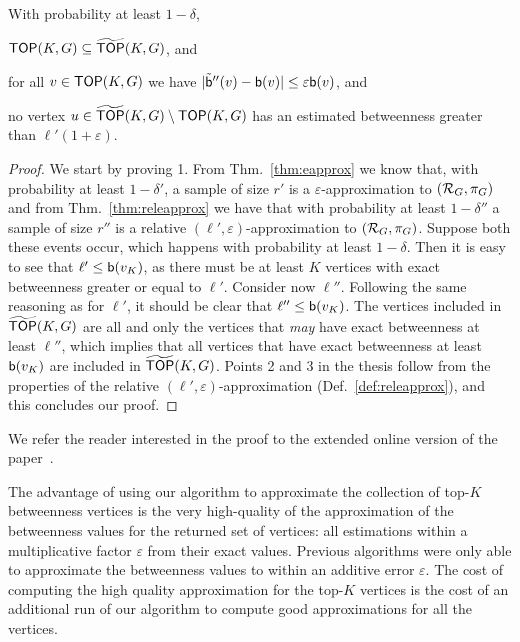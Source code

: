 \begin{lemma}\label{lem:topk}
  With probability at least $1-\delta$, 
  \begin{enumerate*}
    \item $\mathsf{TOP}(K,G)\subseteq \widetilde{\mathsf{TOP}}(K,G)$, and
    \item for all $v\in\mathsf{TOP}(K,G)$ we have
      $|\tilde{\mathsf{b}}''(v)-\mathsf{b}(v)|\le\varepsilon\mathsf{b}(v)$, and
    \item no vertex $u\in\widetilde{\mathsf{TOP}}(K,G)\setminus\mathsf{TOP}(K,G)$ has an estimated
      betweenness greater than $\ell'(1+\varepsilon)$.
  \end{enumerate*}
\end{lemma}
\ifproof
\begin{proof}
  We start by proving 1. From Thm.~\ref{thm:eapprox} we know that, with probability at least
  $1-\delta'$, a sample of size $r'$ is a $\varepsilon$-approximation to
  $(\mathcal{R}_G,\pi_G)$ and from Thm.~\ref{thm:releapprox} we have that with
  probability at least $1-\delta''$ a sample of size $r''$ is a relative
  $(\ell',\varepsilon)$-approximation to $(\mathcal{R}_G,\pi_G)$. Suppose both these
  events occur, which happens with probability at least $1-\delta$. Then it is
  easy to see that $\ell'\le\mathsf{b}(v_K)$, as there must be at least $K$ vertices
  with exact betweenness greater or equal to $\ell'$.  Consider now $\ell''$.
  Following the same reasoning as for $\ell'$, it should be clear that
  $\ell''\le\mathsf{b}(v_K)$. The vertices included in $\widetilde{\mathsf{TOP}}(K,G)$ are all and
  only the vertices that \emph{may} have exact betweenness at least $\ell''$,
  which implies that all vertices that have exact betweenness at least
  $\mathsf{b}(v_K)$ are included in $\widetilde{\mathsf{TOP}}(K,G)$. 
  Points 2 and 3 in the thesis follow from the properties of the relative
  $(\ell',\varepsilon)$-approximation (Def.~\ref{def:releapprox}), and this
  concludes our proof.
\end{proof}
\else
We refer the reader interested in the proof to the extended online version of
the paper~\citep{RiondatoK13}.
\fi

The advantage of using our algorithm to approximate the collection of top-$K$
betweenness vertices is the very high-quality of the approximation of the
betweenness values for the returned set of vertices: all estimations within a
multiplicative factor $\varepsilon$ from their exact values. 
Previous algorithms were only able to approximate the betweenness values to
within an additive error $\varepsilon$.  The cost of computing the high quality
approximation for the top-$K$ vertices is the cost of an additional run of our
algorithm to compute good approximations for all the vertices.

